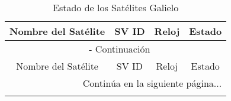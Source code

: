 \begin{center}
    \begin{longtable}{|c|c|c|c|}
        \caption{Estado de los Satélites Galielo} \label{tab:galileo_satellites} \\
        \hline
        \cellcolor{lightblue}Nombre del Satélite & \cellcolor{lightblue}SV ID & \cellcolor{lightblue}Reloj & \cellcolor{lightblue}Estado \\
        \hline
        \endfirsthead

        \multicolumn{4}{c}{{\tablename\ \thetable{} - Continuación}} \\
        \hline
        \cellcolor{lightblue}Nombre del Satélite & \cellcolor{lightblue}SV ID & \cellcolor{lightblue}Reloj & \cellcolor{lightblue}Estado \\
        \hline
        \endhead

        \hline
        \multicolumn{4}{r}{{\fontsize{9}{11}\selectfont Continúa en la siguiente página...}} \\
        \endfoot

        \hline
        \endlastfoot


\end{longtable}
\end{center}
